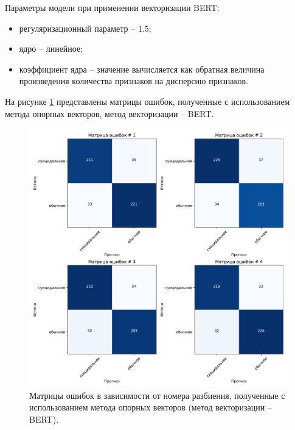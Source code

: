 Параметры модели при применении векторизации BERT:
\begin{itemize}
	\item регуляризационный параметр -- 1.5;
	\item ядро -- линейное;
	\item коэффициент ядра -- значение вычисляется как обратная величина произведения количества признаков на дисперсию признаков.
\end{itemize}

На рисунке \ref{img:svcMatrBert} представлены матрицы ошибок, полученные с использованием метода опорных векторов, метод векторизации -- BERT.
\begin{figure}[H]
	\centering
	\includegraphics[width=\textwidth]{inc/plots/svcMatrBert.pdf}
	\caption{ Матрицы ошибок в зависимости от номера разбиения, полученные с использованием метода опорных векторов (метод векторизации -- BERT). }
	\label{img:svcMatrBert}
\end{figure}

